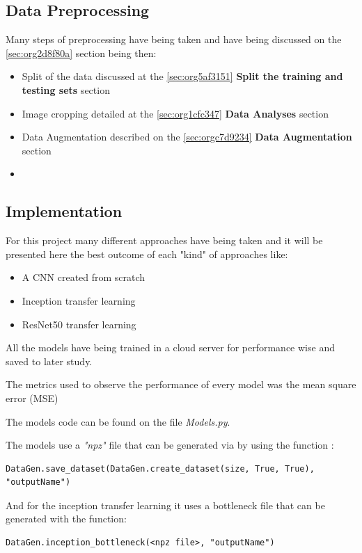 \documentclass[11pt]{article}
\begin{document}
\subsection{Data Preprocessing}
\label{sec:org40651da}

Many steps of preprocessing have being taken and have being discussed on the
\ref{sec:org2d8f80a} section being then:
\begin{itemize}
\item Split of the data discussed at the \ref{sec:org5af3151}
\textbf{Split the training and testing sets} section
\item Image cropping detailed at the \ref{sec:org1cfc347} \textbf{Data Analyses} section
\item Data Augmentation described on the \ref{sec:orgc7d9234} \textbf{Data Augmentation} section
\item 
\end{itemize}
\subsection{Implementation}
\label{sec:org01aec23}

For this project many different approaches have being taken and it will be
presented here the best outcome of each "kind" of approaches like:

\begin{itemize}
\item A CNN created from scratch
\item Inception transfer learning
\item ResNet50 transfer learning
\end{itemize}

All the models have being trained in a cloud server for performance wise and
saved to later study.

The metrics used to observe the performance of every model was the mean square
error (MSE)

The models code can be found on the file \emph{Models.py}.

The models use a \emph{"npz"} file that can be generated via by using the function :
\begin{verbatim}
DataGen.save_dataset(DataGen.create_dataset(size, True, True), "outputName")
\end{verbatim}

And for the inception transfer learning it uses a bottleneck file that can be
generated with the function:

\begin{verbatim}
DataGen.inception_bottleneck(<npz file>, "outputName")
\end{verbatim}
\end{document}
